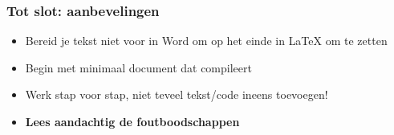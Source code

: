 \documentclass[aspectratio=169]{beamer}
\begin{document}
\begin{frame}
  \frametitle{Tot slot: aanbevelingen}

  \begin{itemize}
    \item Bereid je tekst niet voor in Word om op het einde in {\LaTeX} om te zetten
    \item Begin met minimaal document dat compileert
    \item Werk stap voor stap, niet teveel tekst/code ineens toevoegen!
    \item \textbf{Lees aandachtig de foutboodschappen}
  \end{itemize}


\end{frame}
\end{document}
